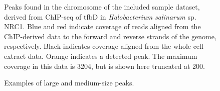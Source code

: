 \documentclass{bioinfo}
\begin{document}
\begin{figure}[!tfbd peak - a nice one]%
  \begin{center}
    {}
  \end{center}
  \caption{Peaks found in the chromosome of the included sample
    dataset, derived from ChIP-seq of tfbD in {\em Halobacterium
      salinarum} sp. NRC1. Blue and red indicate coverage of reads
    aligned from the ChIP-derived data to the forward and reverse
    strands of the genome, respectively. Black indicates coverage
    aligned from the whole cell extract data. Orange indicates a
    detected peak. The maximum coverage in this data is 3204, but is
    shown here truncated at 200.}\label{fig:01}
\end{figure}

\begin{figure}[!tfbd data - reasonable spot showing curation]%
  \begin{center}
    {}
    {}
  \end{center}
  \caption{Examples of large and medium-size peaks.}\label{fig:02}
\end{figure}
\end{document}
